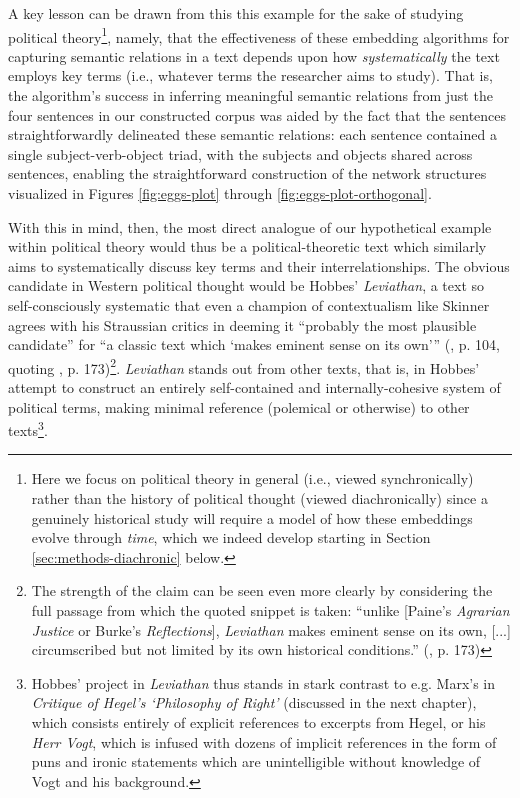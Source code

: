 \documentclass[11pt]{article}
\begin{document}
A key lesson can be drawn from this this example for the sake of studying political theory\footnote{Here we focus on political theory in general (i.e., viewed synchronically) rather than the history of political thought (viewed diachronically) since a genuinely historical study will require a model of how these embeddings evolve through \textit{time}, which we indeed develop starting in Section \ref{sec:methods-diachronic} below.}, namely, that the effectiveness of these embedding algorithms for capturing semantic relations in a text depends upon how \textit{systematically} the text employs key terms (i.e., whatever terms the researcher aims to study). That is, the algorithm's success in inferring meaningful semantic relations from just the four sentences in our constructed corpus was aided by the fact that the sentences straightforwardly delineated these semantic relations: each sentence contained a single subject-verb-object triad, with the subjects and objects shared across sentences, enabling the straightforward construction of the network structures visualized in Figures \ref{fig:eggs-plot} through \ref{fig:eggs-plot-orthogonal}.

With this in mind, then, the most direct analogue of our hypothetical example within political theory would thus be a political-theoretic text which similarly aims to systematically discuss key terms and their interrelationships. The obvious candidate in Western political thought would be Hobbes' \textit{Leviathan}, a text so self-consciously systematic that even a champion of contextualism like Skinner agrees with his Straussian critics in deeming it ``probably the most plausible candidate'' for ``a classic text which `makes eminent sense on its own'{}'' (\cite{tully_meaning_1988}, p. 104, quoting \cite{parekh_history_1973}, p. 173)\footnote{The strength of the claim can be seen even more clearly by considering the full passage from which the quoted snippet is taken: ``unlike [Paine's \textit{Agrarian Justice} or Burke's \textit{Reflections}], \textit{Leviathan} makes eminent sense on its own, [...] circumscribed but not limited by its own historical conditions.'' (\cite{parekh_history_1973}, p. 173)}. \textit{Leviathan} stands out from other texts, that is, in Hobbes' attempt to construct an entirely self-contained and internally-cohesive system of political terms, making minimal reference (polemical or otherwise) to other texts\footnote{Hobbes' project in \textit{Leviathan} thus stands in stark contrast to e.g. Marx's in \textit{Critique of Hegel's `Philosophy of Right'} (discussed in the next chapter), which consists entirely of explicit references to excerpts from Hegel, or his \textit{Herr Vogt}, which is infused with dozens of implicit references in the form of puns and ironic statements which are unintelligible without knowledge of Vogt and his background.}.
\end{document}
